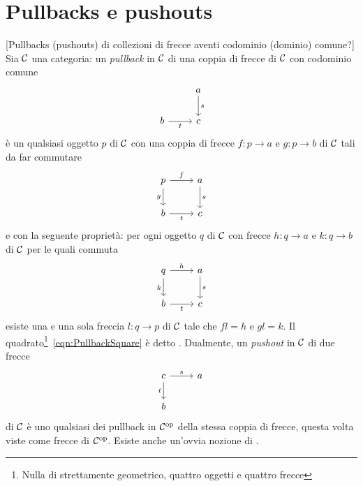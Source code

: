 
\section{Pullbacks e pushouts}

\begin{definizione}
{\color{red} [Pullbacks (pushouts) di collezioni di frecce aventi codominio (dominio) comune?]}
Sia \(\mathcal C\) una categoria: un {\em pullback} in \(\mathcal C\) di una coppia di frecce di \(\mathcal C\) con codominio comune
\[\begin{tikzcd}
                    & a \ar["s", d] \\
b \ar["t", r, swap] & c
\end{tikzcd}\]
è un qualsiasi oggetto \(p\) di \(\mathcal C\) con una coppia di frecce \(f : p \to a\) e \(g : p \to b\) di \(\mathcal C\) tali da far commutare
\begin{equation}\begin{tikzcd}
p \ar["f", r] \ar["g", d, swap] & a \ar["s", d] \\
b \ar["t", r, swap]             & c
\end{tikzcd}\label{eqn:PullbackSquare}\end{equation}
e con la seguente proprietà: per ogni oggetto \(q\) di \(\mathcal C\) con frecce \(h : q \to a\) e \(k : q \to b\) di \(\mathcal C\) per le quali commuta
\[\begin{tikzcd}
q \ar["h", r] \ar["k", d, swap] & a \ar["s", d] \\
b \ar["t", r, swap]             & c
\end{tikzcd}\]
esiste una e una sola freccia \(l : q \to p\) di \(\mathcal C\) tale che \(fl=h\) e \(gl=k\).
%
Il quadrato\footnote{Nulla di strettamente geometrico, quattro oggetti e quattro frecce}~\eqref{eqn:PullbackSquare} è detto . Dualmente, un {\em pushout} in \(\mathcal C\) di due frecce
\[\begin{tikzcd}
c \ar["s", r] \ar["t", d, swap] & a \\
b                               &
\end{tikzcd}\]
di \(\mathcal C\) è uno qualsiasi dei pullback in \(\mathcal C^\text{op}\) della stessa coppia di frecce, questa volta viste come frecce di \(\mathcal C^\text{op}\). Esiste anche un'ovvia nozione di .
\end{definizione}

